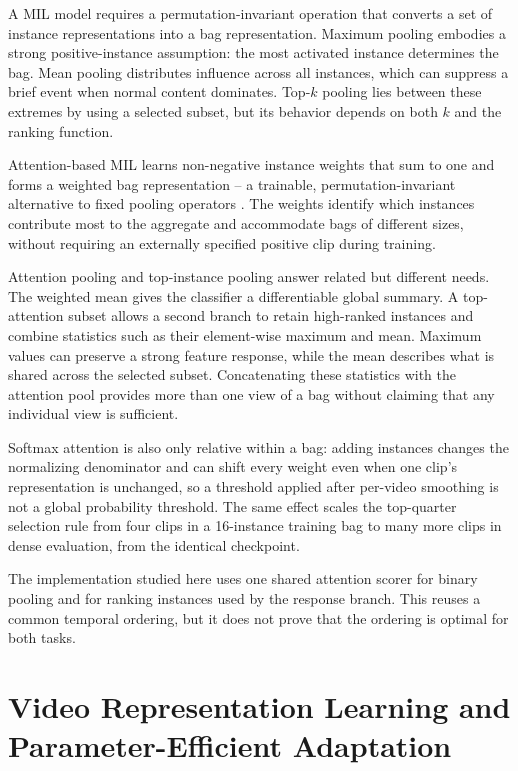 A MIL model requires a permutation-invariant operation that converts a set of
instance representations into a bag representation. Maximum pooling embodies a
strong positive-instance assumption: the most activated instance determines the
bag. Mean pooling distributes influence across all instances, which can suppress
a brief event when normal content dominates. Top-$k$ pooling lies between these
extremes by using a selected subset, but its behavior depends on both $k$ and the
ranking function.

Attention-based MIL learns non-negative instance weights that sum to one and
forms a weighted bag representation -- a trainable, permutation-invariant
alternative to fixed pooling operators \cite{ilse2018attention,zaheer2017deep}.
The weights identify which instances contribute most to the aggregate and
accommodate bags of different sizes, without requiring an externally specified
positive clip during training.

Attention pooling and top-instance pooling answer related but different needs.
The weighted mean gives the classifier a differentiable global summary. A
top-attention subset allows a second branch to retain high-ranked instances and
combine statistics such as their element-wise maximum and mean. Maximum values
can preserve a strong feature response, while the mean describes what is shared
across the selected subset. Concatenating these statistics with the attention
pool provides more than one view of a bag without claiming that any individual
view is sufficient.

Softmax attention is also only relative within a bag: adding instances changes
the normalizing denominator and can shift every weight even when one clip's
representation is unchanged, so a threshold applied after per-video smoothing
is not a global probability threshold. The same effect scales the top-quarter
selection rule from four clips in a 16-instance training bag to many more
clips in dense evaluation, from the identical checkpoint.

The implementation studied here uses one shared attention scorer for binary
pooling and for ranking instances used by the response branch. This reuses a
common temporal ordering, but it does not prove that the ordering is optimal
for both tasks.

\section{Video Representation Learning and Parameter-Efficient Adaptation}
\label{sec:background-representation}

